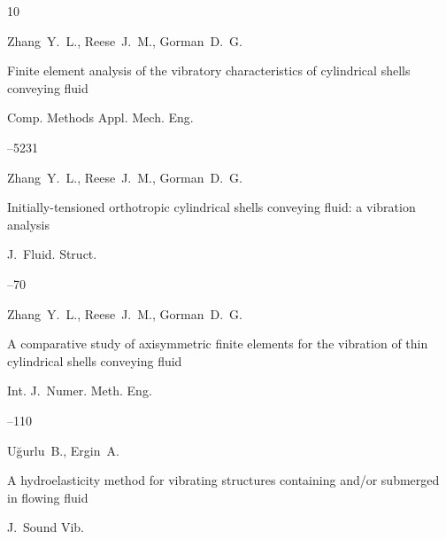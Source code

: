 \begin{thebibliography}{10}

\by Zhang~Y.~L., Reese~J.~M., Gorman~D.~G.

\paper Finite element analysis of the vibratory characteristics of cylindrical shells conveying fluid

\jour Comp. Methods Appl. Mech. Eng.



--5231






\by Zhang~Y.~L., Reese~J.~M., Gorman~D.~G.

\paper Initially-tensioned orthotropic cylindrical shells conveying fluid: a vibration analysis

\jour J.~Fluid. Struct.




--70






\by Zhang~Y.~L., Reese~J.~M., Gorman~D.~G.

\paper A comparative study of axisymmetric finite elements for the vibration of thin cylindrical shells conveying fluid

\jour Int. J.~Numer. Meth. Eng.




--110






\by U\u{g}urlu~B., Ergin~A.

\paper A hydroelasticity method for vibrating structures containing and/or submerged in flowing fluid

\jour J.~Sound Vib.




\end{thebibliography}

